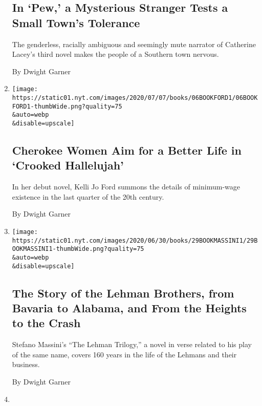 \begin{enumerate}
{  \subsection{In `Pew,' a Mysterious Stranger Tests a Small Town's
  Tolerance}\label{in-pew-a-mysterious-stranger-tests-a-small-towns-tolerance}}

  The genderless, racially ambiguous and seemingly mute narrator of
  Catherine Lacey's third novel makes the people of a Southern town
  nervous.

  By Dwight Garner
\item
  \href{/2020/07/06/books/review-crooked-hallelujah-kelli-jo-ford.html}{}

  \texttt{[image: https://static01.nyt.com/images/2020/07/07/books/06BOOKFORD1/06BOOKFORD1-thumbWide.png?quality=75\\\&auto=webp\\\&disable=upscale]}

  \hypertarget{cherokee-women-aim-for-a-better-life-in-crooked-hallelujah}{%
  \subsection{Cherokee Women Aim for a Better Life in `Crooked
  Hallelujah'}\label{cherokee-women-aim-for-a-better-life-in-crooked-hallelujah}}

  In her debut novel, Kelli Jo Ford summons the details of minimum-wage
  existence in the last quarter of the 20th century.

  By Dwight Garner
\item
  \href{/2020/06/29/books/review-lehman-trilogy-stefano-massini.html}{}

  \texttt{[image: https://static01.nyt.com/images/2020/06/30/books/29BOOKMASSINI1/29BOOKMASSINI1-thumbWide.png?quality=75\\\&auto=webp\\\&disable=upscale]}

  \hypertarget{the-story-of-the-lehman-brothers-from-bavaria-to-alabama-and-from-the-heights-to-the-crash}{%
  \subsection{The Story of the Lehman Brothers, from Bavaria to Alabama,
  and From the Heights to the
  Crash}\label{the-story-of-the-lehman-brothers-from-bavaria-to-alabama-and-from-the-heights-to-the-crash}}

  Stefano Massini's ``The Lehman Trilogy,'' a novel in verse related to
  his play of the same name, covers 160 years in the life of the Lehmans
  and their business.

  By Dwight Garner
\item
  \href{/2020/06/19/books/review-death-in-her-hands-ottessa-moshfegh.html}{}


\end{enumerate}
